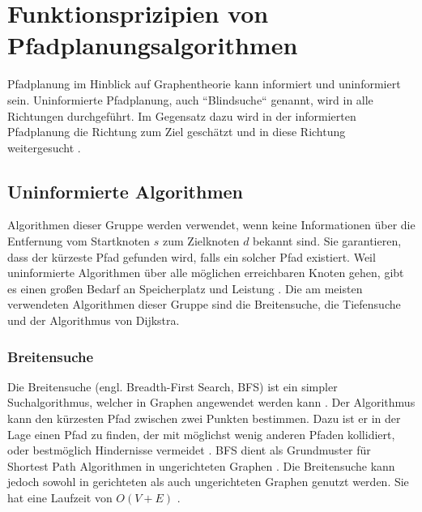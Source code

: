 
\chapter{Funktionsprizipien von Pfadplanungsalgorithmen}

Pfadplanung im Hinblick auf Graphentheorie kann informiert und uninformiert sein. Uninformierte Pfadplanung, auch ``Blindsuche`` genannt, wird in alle Richtungen durchgeführt. Im Gegensatz dazu wird in der informierten Pfadplanung die Richtung zum Ziel geschätzt und in diese Richtung weitergesucht \cite{Man18}. %

\section{Uninformierte Algorithmen}
Algorithmen dieser Gruppe werden verwendet, wenn keine Informationen über die Entfernung vom Startknoten $s$ zum Zielknoten $d$ bekannt sind. Sie garantieren, dass der kürzeste Pfad gefunden wird, falls ein solcher Pfad existiert. Weil uninformierte Algorithmen über alle möglichen erreichbaren Knoten gehen, gibt es einen großen Bedarf an Speicherplatz und Leistung \cite{Noo15}. Die am meisten verwendeten Algorithmen dieser Gruppe sind die Breitensuche, die Tiefensuche und der Algorithmus von Dijkstra.

\subsection{Breitensuche}

Die Breitensuche (engl. Breadth-First Search, BFS) ist ein simpler Suchalgorithmus, welcher in Graphen angewendet werden kann \cite[S.594]{Cormen.2009}. Der Algorithmus kann den kürzesten Pfad zwischen zwei Punkten bestimmen. Dazu ist er in der Lage einen Pfad zu finden, der mit möglichst wenig anderen Pfaden kollidiert, oder bestmöglich Hindernisse vermeidet \cite{Lee.1961}. BFS dient als Grundmuster für Shortest Path Algorithmen in ungerichteten Graphen \cite{Ottmann.2017}. Die Breitensuche kann jedoch sowohl in gerichteten als auch ungerichteten Graphen genutzt werden. Sie hat eine Laufzeit von $O(V + E)$ \cite[S.597]{Cormen.2009}.

